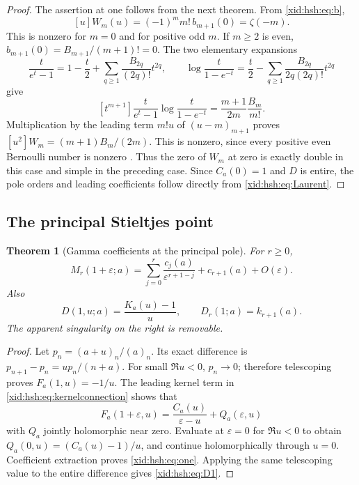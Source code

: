 \documentclass[11pt,a4paper]{article}
\numberwithin{equation}{section}
\newtheorem{theorem}{Theorem}[section]
\theoremstyle{definition}
\theoremstyle{remark}
\begin{document}
\begin{proof}
The assertion at one follows from the next theorem. From
\eqref{xid:hsh:eq:b},
\[
 [u]W_m(u)=(-1)^m m!\,b_{m+1}(0)=\zeta(-m).
\]
This is nonzero for $m=0$ and for positive odd $m$. If $m\ge2$ is even,
$b_{m+1}(0)=B_{m+1}/(m+1)!=0$. The two elementary expansions
\[
 \frac{t}{e^t-1}=1-\frac t2+
       \sum_{q\ge1}\frac{B_{2q}}{(2q)!}t^{2q},\qquad
 \log\frac{t}{1-e^{-t}}
       =\frac t2-\sum_{q\ge1}
          \frac{B_{2q}}{2q(2q)!}t^{2q}
\]
give
\[
 [t^{m+1}]\frac{t}{e^t-1}\log\frac{t}{1-e^{-t}}
       =\frac{m+1}{2m}\frac{B_m}{m!}.
\]
Multiplication by the leading term $m!u$ of $(u-m)_{m+1}$ proves
$[u^2]W_m=(m+1)B_m/(2m)$. This is nonzero, since every positive even
Bernoulli number is nonzero \cite{hsh:DLMFBernoulli}. Thus the zero of
$W_m$ at zero is exactly double in this case and simple in the preceding
case. Since $C_a(0)=1$ and $D$ is entire, the pole orders and leading
coefficients follow directly from \eqref{xid:hsh:eq:Laurent}.
\end{proof}

\subsection{The principal Stieltjes point}

\begin{theorem}[Gamma coefficients at the principal pole]
\label{xid:hsh:thm:one}
For $r\ge0$,
\begin{equation}\label{xid:hsh:eq:one}
 M_r(1+\varepsilon;a)
 =\sum_{j=0}^r\frac{c_j(a)}{\varepsilon^{r+1-j}}
       +c_{r+1}(a)+O(\varepsilon).
\end{equation}
Also
\begin{equation}\label{xid:hsh:eq:D1}
 D(1,u;a)=\frac{K_a(u)-1}{u},\qquad D_r(1;a)=k_{r+1}(a).
\end{equation}
The apparent singularity on the right is removable.
\end{theorem}

\begin{proof}
Let $p_n=(a+u)_n/(a)_n$. Its exact difference is
$p_{n+1}-p_n=up_n/(n+a)$. For small $\Re u<0$, $p_n\to0$;
therefore telescoping proves $F_a(1,u)=-1/u$.
The leading kernel term in \eqref{xid:hsh:eq:kernelconnection} shows that
\[
 F_a(1+\varepsilon,u)=\frac{C_a(u)}{\varepsilon-u}
                         +Q_a(\varepsilon,u)
\]
with $Q_a$ jointly holomorphic near zero. Evaluate at $\varepsilon=0$
for $\Re u<0$ to obtain $Q_a(0,u)=(C_a(u)-1)/u$, and continue
holomorphically through $u=0$. Coefficient extraction proves
\eqref{xid:hsh:eq:one}. Applying the same telescoping value to the
entire difference gives \eqref{xid:hsh:eq:D1}.
\end{proof}
\end{document}
